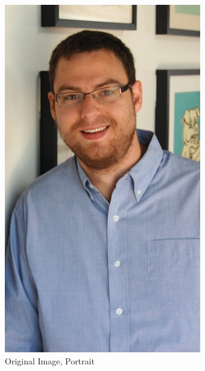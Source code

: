 \documentclass[11pt]{article}
\begin{document}
\begin{figure}[H]
	\centering
	\begin{subfigure}[b]{.48\linewidth}
		\includegraphics[width=\linewidth]{Portrait}
		\caption{Original Image, Portrait}
		\label{fig:trafin}
	\end{subfigure}
	\begin{subfigure}[b]{.48\linewidth}

\end{subfigure}
\end{figure}
\end{document}
